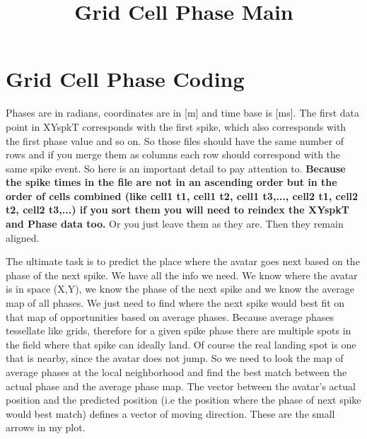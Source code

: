 \documentclass[11pt]{article}
\title{Grid Cell Phase Main}
\begin{document}
    
    
    \maketitle
    
    

    
    \section{Grid Cell Phase Coding}\label{grid-cell-phase-coding}

Phases are in radians, coordinates are in {[}m{]} and time base is
{[}ms{]}. The first data point in XYspkT corresponds with the first
spike, which also corresponds with the first phase value and so on. So
those files should have the same number of rows and if you merge them as
columns each row should correspond with the same spike event. So here is
an important detail to pay attention to. \textbf{Because the spike times
in the file are not in an ascending order but in the order of cells
combined (like cell1 t1, cell1 t2, cell1 t3,..., cell2 t1, cell2 t2,
cell2 t3,...) if you sort them you will need to reindex the XYspkT and
Phase data too.} Or you just leave them as they are. Then they remain
aligned.

The ultimate task is to predict the place where the avatar goes next
based on the phase of the next spike. We have all the info we need. We
know where the avatar is in space (X,Y), we know the phase of the next
spike and we know the average map of all phases. We just need to find
where the next spike would best fit on that map of opportunities based
on average phases. Because average phases tessellate like grids,
therefore for a given spike phase there are multiple spots in the field
where that spike can ideally land. Of course the real landing spot is
one that is nearby, since the avatar does not jump. So we need to look
the map of average phases at the local neighborhood and find the best
match between the actual phase and the average phase map. The vector
between the avatar's actual position and the predicted position (i.e the
position where the phase of next spike would best match) defines a
vector of moving direction. These are the small arrows in my plot.
\end{document}
